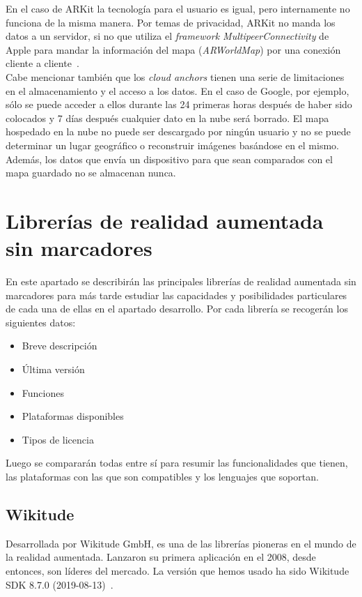 En el caso de ARKit la tecnología para el usuario es igual, pero internamente no funciona de la misma manera. Por temas de privacidad, ARKit no manda los datos a un servidor, si no que utiliza el \textit{framework MultipeerConnectivity} de Apple para mandar la información del mapa (\textit{ARWorldMap}) por una conexión cliente a cliente~\cite{Apple_CloudAnchor}.\\

Cabe mencionar también que los \textit{cloud anchors} tienen una serie de limitaciones en el almacenamiento y el acceso a los datos. En el caso de Google, por ejemplo, sólo se puede acceder a ellos durante las 24 primeras horas después de haber sido colocados y 7 días después cualquier dato en la nube será borrado. El mapa hospedado en la nube no puede ser descargado por ningún usuario y no se puede determinar un lugar geográfico o reconstruir imágenes basándose en el mismo. Además, los datos que envía un dispositivo para que sean comparados con el mapa guardado no se almacenan nunca.\\

\section{Librerías de realidad aumentada sin marcadores}

En este apartado se describirán las principales librerías de realidad aumentada sin marcadores para más tarde estudiar las capacidades y posibilidades particulares de cada una de ellas en el apartado desarrollo.
Por cada librería se recogerán los siguientes datos:
\begin{itemize}
\item Breve descripción
\item Última versión
\item Funciones
\item Plataformas disponibles
\item Tipos de licencia
\end{itemize}
Luego se compararán todas entre sí para resumir las funcionalidades que tienen, las plataformas con las que son compatibles y los lenguajes que soportan.

\subsection{Wikitude}

Desarrollada por Wikitude GmbH, es una de las librerías pioneras en el mundo de la realidad aumentada. Lanzaron su primera aplicación en el 2008, desde entonces, son líderes del mercado. La versión que hemos usado ha sido Wikitude SDK 8.7.0 (2019-08-13)~\cite{Wikitude}.\\

